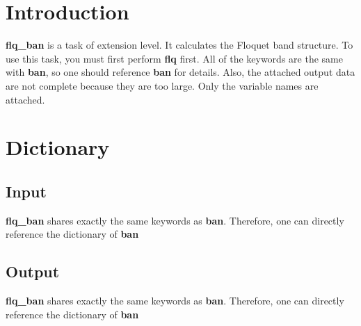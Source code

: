 \documentclass[10pt,a4paper]{article}
\begin{document}
\section{Introduction}
\textbf{flq\_ban} is a task of extension level. It calculates the Floquet band structure. To use this task, you must first perform \textbf{flq} first. All of the keywords are the same with \textbf{ban}, so one should reference \textbf{ban} for details. Also, the attached output data are not complete because they are too large. Only the variable names are attached.  

\section{Dictionary}

\subsection{Input}
 \textbf{flq\_ban} shares exactly the same keywords as \textbf{ban}. Therefore, one can directly reference the dictionary of \textbf{ban}

\subsection{Output}
 \textbf{flq\_ban} shares exactly the same keywords as \textbf{ban}. Therefore, one can directly reference the dictionary of \textbf{ban} \\ \\
 \\ \\
 \\ \\
 \\ \\
 \\ \\
  \\ \\
  \\ \\
 \\ \\
 \\ \\
 \\ \\
 \\ \\
  \\ \\
  \\ \\
  \\ \\
  \\ 
  
\end{document}
